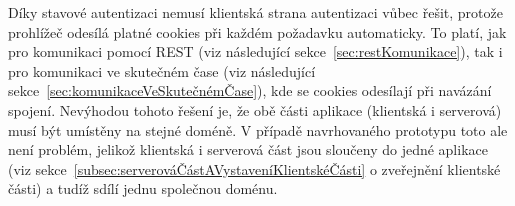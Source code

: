 Díky stavové autentizaci nemusí klientská strana autentizaci vůbec řešit, protože prohlížeč odesílá platné cookies při každém požadavku automaticky.
To platí, jak pro komunikaci pomocí \gls{REST} (viz následující sekce~\ref{sec:restKomunikace}), tak i pro komunikaci ve skutečném čase (viz následující sekce~\ref{sec:komunikaceVeSkutečnémČase}), kde se cookies odesílají při navázání spojení.
Nevýhodou tohoto řešení je, že obě části aplikace (klientská i serverová) musí být umístěny na stejné doméně.
V případě navrhovaného prototypu toto ale není problém, jelikož klientská i serverová část jsou sloučeny do jedné aplikace (viz sekce~\ref{subsec:serverováČástAVystaveníKlientskéČásti} o zveřejnění klientské části) a tudíž sdílí jednu společnou doménu.
